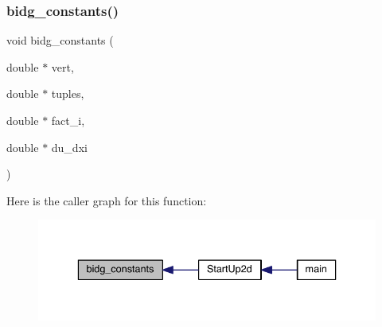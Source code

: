 \subsubsection{\texorpdfstring{bidg\+\_\+constants()}{bidg\_constants()}}
{\footnotesize\ttfamily void bidg\+\_\+constants (\begin{DoxyParamCaption}\item[{double $\ast$}]{vert,  }\item[{double $\ast$}]{tuples,  }\item[{double $\ast$}]{fact\+\_\+i,  }\item[{double $\ast$}]{du\+\_\+dxi }\end{DoxyParamCaption})}

Here is the caller graph for this function\+:\nopagebreak
\begin{figure}[H]
\begin{center}
\leavevmode
\includegraphics[width=336pt]{a00572_a45390a77c9093b8b1144623da67508c8_icgraph}
\end{center}
\end{figure}
